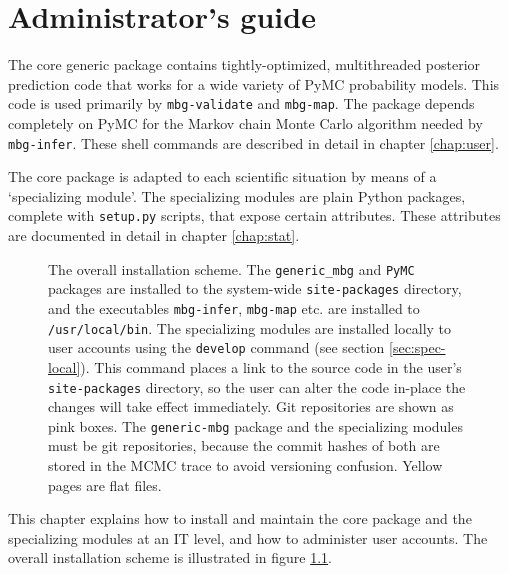 % 

\chapter{Administrator's guide} 
\label{chap:admin} 

The core generic package contains tightly-optimized, multithreaded posterior prediction code that works for a wide variety of PyMC probability models. This code is used primarily by \texttt{mbg-validate} and \texttt{mbg-map}. The package depends completely on PyMC for the Markov chain Monte Carlo algorithm needed by \texttt{mbg-infer}. These shell commands are described in detail in chapter \ref{chap:user}.

The core package is adapted to each scientific situation by means of a `specializing module'. The specializing modules are plain Python packages, complete with \texttt{setup.py} scripts, that expose certain attributes. These attributes are documented in detail in chapter \ref{chap:stat}.

\begin{figure}[hhh]
    \begin{center}
    \end{center}
    \caption{The overall installation scheme. The \texttt{generic\_mbg} and \texttt{PyMC} packages are installed to the system-wide \texttt{site-packages} directory, and the executables \texttt{mbg-infer}, \texttt{mbg-map} etc. are installed to \texttt{/usr/local/bin}. The specializing modules are installed locally to user accounts using the \texttt{develop} command (see section \ref{sec:spec-local}). This command places a link to the source code in the user's \texttt{site-packages} directory, so the user can alter the code in-place the changes will take effect immediately. Git repositories are shown as pink boxes. The \texttt{generic-mbg} package and the specializing modules must be git repositories, because the commit hashes of both are stored in the MCMC trace to avoid versioning confusion. Yellow pages are flat files.   }
    \label{fig:installation}
\end{figure}

\bigskip
This chapter explains how to install and maintain the core package and the specializing modules at an IT level, and how to administer user accounts. The overall installation scheme is illustrated in figure \ref{fig:installation}.

